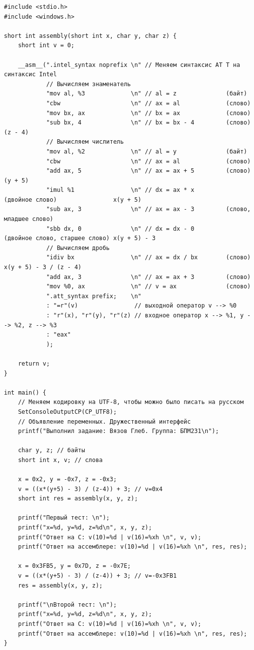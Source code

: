 \documentclass[12pt]{article}
\begin{document}
\begin{lstlisting}[label=string_code1,caption=C]
#include <stdio.h>
#include <windows.h>

short int assembly(short int x, char y, char z) {
    short int v = 0;

    __asm__(".intel_syntax noprefix \n" // Меняем синтаксис AT T на синтаксис Intel
            // Вычисляем знаменатель
            "mov al, %3             \n" // al = z              (байт)
            "cbw                    \n" // ax = al             (слово)
            "mov bx, ax             \n" // bx = ax             (слово)
            "sub bx, 4              \n" // bx = bx - 4         (слово)                        (z - 4)
            // Вычисляем числитель
            "mov al, %2             \n" // al = y              (байт)
            "cbw                    \n" // ax = al             (слово)
            "add ax, 5              \n" // ax = ax + 5         (слово)                        (y + 5)
            "imul %1                \n" // dx = ax * x         (двойное слово)                x(y + 5)
            "sub ax, 3              \n" // ax = ax - 3         (слово, младшее слово)
            "sbb dx, 0              \n" // dx = dx - 0         (двойное слово, старшее слово) x(y + 5) - 3
            // Вычисляем дробь
            "idiv bx                \n" // ax = dx / bx        (слово)                        x(y + 5) - 3 / (z - 4)
            "add ax, 3              \n" // ax = ax + 3         (слово)
            "mov %0, ax             \n" // v = ax              (слово)
            ".att_syntax prefix;    \n"
            : "=r"(v)                // выходной оператор v --> %0
            : "r"(x), "r"(y), "r"(z) // входное оператор x --> %1, y --> %2, z --> %3
            : "eax"
            );

    return v;
}

int main() {
    // Меняем кодировку на UTF-8, чтобы можно было писать на русском
    SetConsoleOutputCP(CP_UTF8);
    // Объявление переменных. Дружественный интерфейс
    printf("Выполнил задание: Вязов Глеб. Группа: БПМ231\n");

    char y, z; // байты
    short int x, v; // слова

    x = 0x2, y = -0x7, z = -0x3;
    v = ((x*(y+5) - 3) / (z-4)) + 3; // v=0x4
    short int res = assembly(x, y, z);

    printf("Первый тест: \n");
    printf("x=%d, y=%d, z=%d\n", x, y, z);
    printf("Ответ на C: v(10)=%d | v(16)=%xh \n", v, v);
    printf("Ответ на ассемблере: v(10)=%d | v(16)=%xh \n", res, res);

    x = 0x3FB5, y = 0x7D, z = -0x7E;
    v = ((x*(y+5) - 3) / (z-4)) + 3; // v=-0x3FB1
    res = assembly(x, y, z);

    printf("\nВторой тест: \n");
    printf("x=%d, y=%d, z=%d\n", x, y, z);
    printf("Ответ на C: v(10)=%d | v(16)=%xh \n", v, v);
    printf("Ответ на ассемблере: v(10)=%d | v(16)=%xh \n", res, res);
}
\end{lstlisting} 
\end{document}

